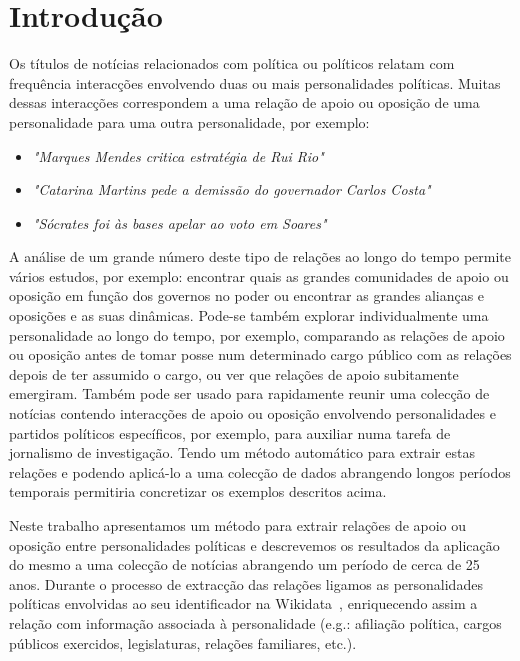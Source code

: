 \documentclass[a4paper, twocolumn, 11pt, twoside]{article}
\begin{document}

\section{Introdução}
\label{sec:intro}

Os títulos de notícias relacionados com política ou políticos relatam com frequência interacções envolvendo duas ou mais personalidades políticas. Muitas dessas interacções correspondem a uma relação de apoio ou oposição de uma personalidade para uma outra personalidade, por exemplo:

\begin{itemize}
\item{\textit{"Marques Mendes critica estratégia de Rui Rio"}}
\item{\textit{"Catarina Martins pede a demissão do governador Carlos Costa"}}
\item{\textit{"Sócrates foi às bases apelar ao voto em Soares"}}
\end{itemize}

A análise de um grande número deste tipo de relações ao longo do tempo permite vários estudos, por exemplo: encontrar quais as grandes comunidades de apoio ou oposição em função dos governos no poder ou encontrar as grandes alianças e oposições e as suas dinâmicas. Pode-se também explorar individualmente uma personalidade ao longo do tempo, por exemplo, comparando as relações de apoio ou oposição antes de tomar posse num determinado cargo público com as relações depois de ter assumido o cargo, ou ver que relações de apoio subitamente emergiram. Também pode ser usado para rapidamente reunir uma colecção de notícias contendo interacções de apoio ou oposição envolvendo personalidades e partidos políticos específicos, por exemplo, para auxiliar numa tarefa de jornalismo de investigação. Tendo um método automático para extrair estas relações e podendo aplicá-lo a uma colecção de dados abrangendo longos períodos temporais permitiria concretizar os exemplos descritos acima.

Neste trabalho apresentamos um método para extrair relações de apoio ou oposição entre personalidades políticas e descrevemos os resultados da aplicação do mesmo a uma colecção de notícias abrangendo um período de cerca de 25 anos. Durante o processo de extracção das relações ligamos as personalidades políticas envolvidas ao seu identificador na Wikidata~\citep{MKGGB2018}, enriquecendo assim a relação com informação associada à personalidade (e.g.: afiliação política, cargos públicos exercidos, legislaturas, relações familiares, etc.). 
\end{document}
